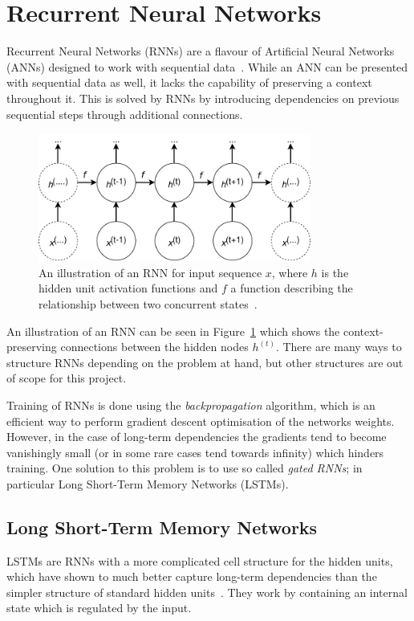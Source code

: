 \section{Recurrent Neural Networks}
Recurrent Neural Networks (RNNs) are a flavour of Artificial Neural Networks (ANNs) designed to work with sequential data~\cite{goodfellow2016deep}. While an ANN can be presented with sequential data as well, it lacks the capability of preserving a context throughout it. This is solved by RNNs by introducing dependencies on previous sequential steps through additional connections.
\begin{figure}[H]
  \centering
  \includegraphics[width=0.8\textwidth]{graphics/rnn-2}
  \caption{An illustration of an RNN for input sequence $x$, where $h$ is the hidden unit activation functions and $f$ a function describing the relationship between two concurrent states~\cite{goodfellow2016deep}.}\label{fig:rnn}
\end{figure}
An illustration of an RNN can be seen in Figure~\ref{fig:rnn} which
shows the context-preserving connections between the hidden nodes
$h^{(t)}$. There are many ways to structure RNNs depending on the
problem at hand, but other structures are out of scope for this project.

Training of RNNs is done using the \textit{backpropagation} algorithm, which is an efficient way to perform gradient descent optimisation of the networks weights. However, in the case of long-term dependencies the gradients tend to become vanishingly small (or in some rare cases tend towards infinity) which hinders training. One solution to this problem is to use so called \textit{gated RNNs}; in particular Long Short-Term Memory Networks (LSTMs).

\subsection{Long Short-Term Memory Networks}
LSTMs are RNNs with a more complicated cell structure for the hidden units, which have shown to much better capture long-term dependencies than the simpler structure of standard hidden units~\cite{hochreiter1997long}. They work by containing an internal state which is regulated by the input.

